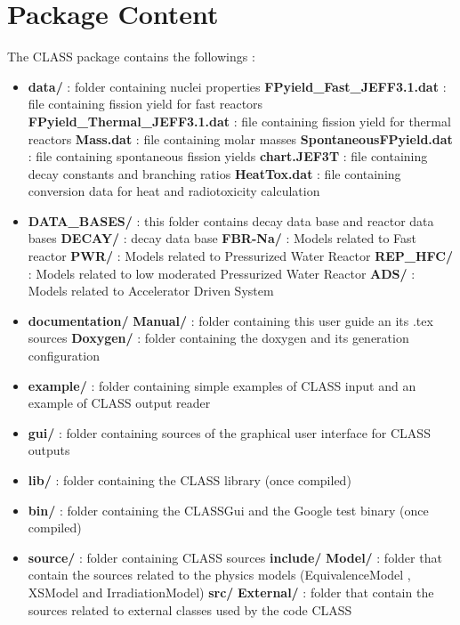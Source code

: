 \chapter{Package Content}
The CLASS package contains the followings :
\begin{itemize}
\item   \textbf{data/} : folder containing nuclei properties
\subitem \textbf{FPyield\_Fast\_JEFF3.1.dat }     : file containing fission yield for fast reactors
\subitem \textbf{FPyield\_Thermal\_JEFF3.1.dat}   : file containing fission yield for thermal reactors
\subitem \textbf{Mass.dat }                     : file containing molar masses
\subitem \textbf{SpontaneousFPyield.dat }       : file containing spontaneous fission yields
\subitem \textbf{chart.JEF3T}                   : file containing decay constants and branching ratios
\subitem \textbf{HeatTox.dat}                   : file containing conversion data for heat and radiotoxicity calculation

 \item \textbf{DATA\_BASES/}  : this folder contains decay data base and reactor data bases
 \subitem \textbf{DECAY/}     : decay data base
 \subitem \textbf{FBR-Na/}    : Models related to Fast reactor
 \subitem \textbf{PWR/}       : Models related to Pressurized Water Reactor
 \subitem \textbf{REP\_HFC/}   : Models related to low moderated Pressurized Water Reactor 
 \subitem \textbf{ADS/}       : Models related to Accelerator Driven System
 
 \item \textbf{documentation/} 
 \subitem \textbf{Manual/}    : folder containing this user guide an its .tex sources
 \subitem \textbf{Doxygen/}   : folder containing the doxygen and its generation configuration 

\item \textbf{example/} : folder containing simple examples of CLASS input and an example of CLASS output reader

\item \textbf{gui/} : folder containing sources of the graphical user interface for CLASS outputs
 
\item \textbf{lib/} : folder containing the CLASS library (once compiled)
\item \textbf{bin/} : folder containing the CLASSGui and the Google test binary (once compiled)

\item \textbf{source/} : folder containing CLASS sources
\subitem \textbf{include/}
\subitem \textbf{Model/} : folder that contain the sources related to the physics models (EquivalenceModel , XSModel and IrradiationModel)
\subitem \textbf{src/}
\subitem \textbf{External/} : folder that contain the sources related to external classes used by the code CLASS


\end{itemize}
